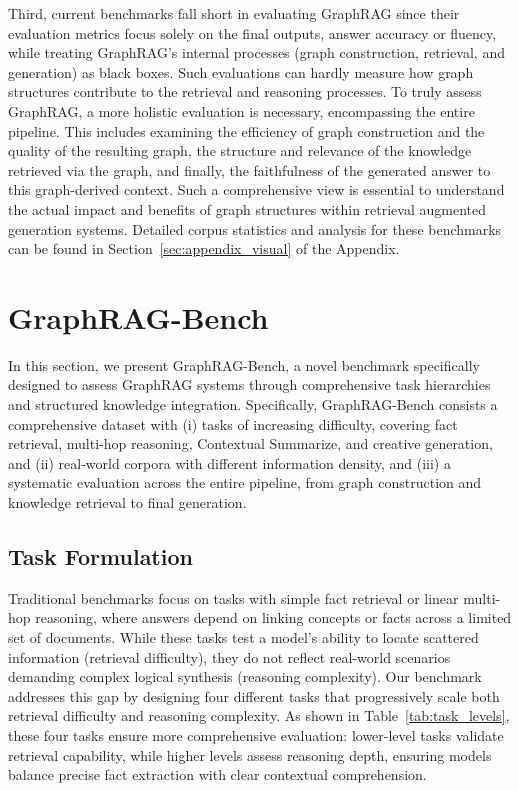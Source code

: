 \documentclass{article} %
\begin{document}
Third, current benchmarks fall short in evaluating GraphRAG since their evaluation metrics focus solely on the final outputs, answer accuracy or fluency, while treating GraphRAG's internal processes (graph construction, retrieval, and generation) as black boxes. Such evaluations can hardly measure how graph structures contribute to the retrieval and reasoning processes. To truly assess GraphRAG, a more holistic evaluation is necessary, encompassing the entire pipeline. This includes examining the efficiency of graph construction and the quality of the resulting graph, the structure and relevance of the knowledge retrieved via the graph, and finally, the faithfulness of the generated answer to this graph-derived context. Such a comprehensive view is essential to understand the actual impact and benefits of graph structures within retrieval augmented generation systems. Detailed corpus statistics and analysis for these benchmarks can be found in Section~\ref{sec:appendix_visual} of the Appendix.


\section{GraphRAG-Bench}
In this section, we present GraphRAG-Bench, a novel benchmark specifically designed to assess GraphRAG systems through comprehensive task hierarchies and structured knowledge integration. 
Specifically, GraphRAG-Bench consists a comprehensive dataset with (i) tasks of increasing difficulty, covering fact retrieval, multi-hop reasoning, Contextual Summarize, and creative generation, and (ii) real-world corpora with different information density, and (iii) a systematic evaluation across the entire pipeline, from graph construction and knowledge retrieval to final generation. 

\subsection{Task Formulation}
Traditional benchmarks focus on tasks with simple fact retrieval or linear multi-hop reasoning, where answers depend on linking concepts or facts across a limited set of documents. While these tasks test a model’s ability to locate scattered information (retrieval difficulty), they do not reflect real-world scenarios demanding complex logical synthesis (reasoning complexity).
Our benchmark addresses this gap by designing four different tasks that progressively scale both retrieval difficulty and reasoning complexity. As shown in Table~\ref{tab:task_levels}, these four tasks ensure more comprehensive evaluation: lower-level tasks validate retrieval capability, while higher levels assess reasoning depth, ensuring models balance precise fact extraction with clear contextual comprehension.
\end{document}
